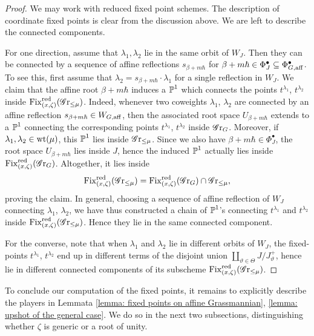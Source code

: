 \begin{proof}
We may work with reduced fixed point schemes.
The description of coordinate fixed points is clear from the discussion above. We are left to describe the connected components.


For one direction, assume that $\lambda_1, \lambda_2$ lie in the same orbit of $W_J$. Then they can be connected by a sequence of affine reflections $s_{\beta + m\hbar}$ for $\beta+m\hbar \in \Phi^{\bullet}_J \subseteq \Phi^{\bullet}_{G, \aff}$. To see this, first assume that $\lambda_2 = s_{\beta + m\hbar} \cdot \lambda_1$ for a single reflection in $W_J$. We claim that the affine root $\beta + m\hbar$ induces a $\P^1$ which connects the points $t^{\lambda_1}$, $t^{\lambda_2}$ inside $\Fix^{\red}_{(x, \zeta)}(\Gr_{\leq \mu})$.
%
Indeed, whenever two coweights $\lambda_1$, $\lambda_2$ are connected by an affine reflection $s_{\beta+m\hbar} \in W_{G, \aff}$, then the associated root space $U_{\beta + m\hbar}$ extends to a $\P^1$ connecting the corresponding points $t^{\lambda_1}$, $t^{\lambda_2}$ inside $\Gr_G$. Moreover, if $\lambda_1, \lambda_2 \in \wt(\mu)$, this $\P^1$ lies inside $\Gr_{\leq \mu}$. Since we also have ${\beta + m\hbar} \in \Phi^{\bullet}_J$, the root space $U_{\beta + m\hbar}$ lies inside $J$, hence the induced $\P^1$ actually lies inside $\Fix^{\red}_{(x, \zeta)}(\Gr_G)$. Altogether, it lies inside 
\begin{equation*}
    \Fix^{\red}_{(x, \zeta)}(\Gr_{\leq \mu}) = \Fix^{\red}_{(x, \zeta)}(\Gr_G) \cap \Gr_{\leq \mu},
\end{equation*}
proving the claim. 
%
In general, choosing a sequence of affine reflection of $W_J$ connecting $\lambda_1$, $\lambda_2$, we have thus constructed a chain of $\P^1$'s connecting $t^{\lambda_1}$ and $t^{\lambda_2}$ inside $\Fix^{\red}_{(x, \zeta)}(\Gr_{\leq \mu})$. Hence they lie in the same connected component.


For the converse, note that when $\lambda_1$ and $\lambda_2$ lie in different orbits of $W_J$, the fixed-points  $t^{\lambda_1}$, $t^{\lambda_2}$ end up in different terms of the disjoint union $\coprod_{\vartheta \in \Theta} J/J^+_{\vartheta}$, hence lie in different connected components of its subscheme $\Fix^{\red}_{(x, \zeta)}(\Gr_{\leq \mu})$.
\end{proof}

To conclude our computation of the fixed points, it remains to explicitly describe the players in Lemmata \ref{lemma: fixed points on affine Grassmannian}, \ref{lemma: upshot of the general case}. We do so in the next two subsections, distinguishing whether $\zeta$ is generic or a root of unity.








